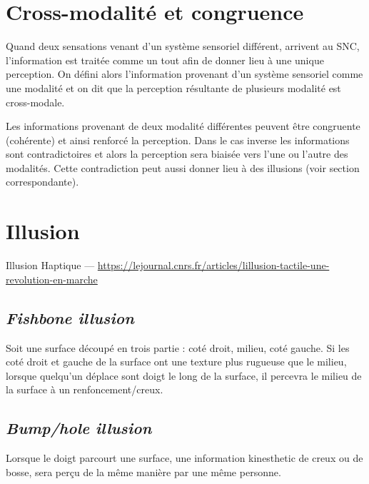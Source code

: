 \section{Cross-modalité et congruence}
Quand deux sensations venant d’un système sensoriel différent, arrivent au SNC, l’information est traitée comme un tout afin de donner lieu à une unique perception. On défini alors l’information provenant d’un système sensoriel comme une modalité et on dit que la perception résultante de plusieurs modalité est cross-modale.\par
Les informations provenant de deux modalité différentes peuvent être congruente (cohérente) et ainsi renforcé la perception. Dans le cas inverse les informations sont contradictoires et alors la perception sera biaisée vers l’une ou l’autre des modalités. Cette contradiction peut aussi donner lieu à des illusions (voir section correspondante).\par

\section{Illusion}
Illusion Haptique --- \url{https://lejournal.cnrs.fr/articles/lillusion-tactile-une-revolution-en-marche}\par

\subsection{ \textit{Fishbone illusion}}
Soit une surface découpé en trois partie : coté droit, milieu, coté gauche. Si les coté droit et gauche de la surface ont une texture plus rugueuse que le milieu, lorsque quelqu’un déplace sont doigt le long de la surface, il percevra le milieu de la surface à un renfoncement/creux.\par

\subsection{ \textit{Bump/hole illusion}}
Lorsque le doigt parcourt une surface, une information kinesthetic de creux ou de bosse, sera perçu de la même manière par une même personne.\par

